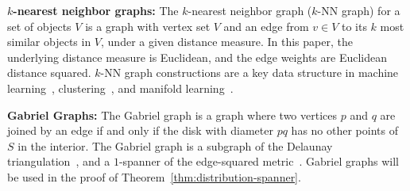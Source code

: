 \vspace{3 mm}
\noindent \textbf{$k$-nearest neighbor graphs:} The $k$-nearest neighbor graph
($k$-NN graph) for a set of objects $V$ is a graph with vertex set $V$
and an edge from $v\in V$ to its $k$ most similar objects in $V$, under
a given distance measure. In this paper, the underlying distance
measure is Euclidean, and the edge weights are Euclidean distance
squared.
$k$-NN
graph constructions are a key data structure in machine
learning~\cite{Dong11, Chen11}, clustering~\cite{vL09}, and manifold learning~\cite{tenenbaum00global}.

\vspace{3 mm}
\noindent \textbf{Gabriel Graphs:} The Gabriel graph is a graph where
two vertices $p$ and $q$ are joined by an edge if and only if the disk
with diameter $pq$ has no other points of $S$ in the interior. The
Gabriel graph is a subgraph of the Delaunay
triangulation~\cite{SridharMaster}, and a
$1$-spanner of the edge-squared metric~\cite{SridharMaster}. Gabriel
graphs will be used in the proof of
Theorem~\ref{thm:distribution-spanner}.
